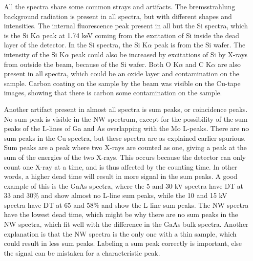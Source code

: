 All the spectra share some common strays and artifacts.
The bremsstrahlung background radiation is present in all spectra, but with different shapes and intensities.
The internal fluorescence peak present in all but the Si spectra, which is the Si K$\alpha$ peak at 1.74 keV coming from the excitation of Si inside the dead layer of the detector.
In the Si spectra, the Si K$\alpha$ peak is from the Si wafer.
The intensity of the Si K$\alpha$ peak could also be increased by excitations of Si by X-rays from outside the beam, because of the Si wafer.
Both O K$\alpha$ and C K$\alpha$ are also present in all spectra, which could be an oxide layer and contamination on the sample.
Carbon coating on the sample by the beam was visible on the Cu-tape images, showing that there is carbon some contamination on the sample.


Another artifact present in almost all spectra is sum peaks, or coincidence peaks.
No sum peak is visible in the NW spectrum, except for the possibility of the sum peaks of the L-lines of Ga and As overlapping with the Mo L-peaks.
There are no sum peaks in the Cu spectra, but these spectra are as explained earlier spurious.
Sum peaks are a peak where two X-rays are counted as one, giving a peak at the sum of the energies of the two X-rays.
This occurs because the detector can only count one X-ray at a time, and is thus affected by the counting time.
In other words, a higher dead time will result in more signal in the sum peaks.
A good example of this is the GaAs spectra, where the 5 and 30 kV spectra have DT at 33 and 30\% and show almost no L-line sum peaks, while the 10 and 15 kV spectra have DT at 65 and 58\% and show the L-line sum peaks.
The NW spectra have the lowest dead time, which might be why there are no sum peaks in the NW spectra, which fit well with the difference in the GaAs bulk spectra.
Another explanation is that the NW spectra is the only one with a thin sample, which could result in less sum peaks.
Labeling a sum peak correctly is important, else the signal can be mistaken for a characteristic peak.

